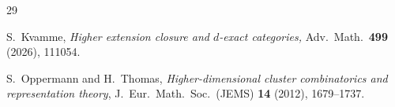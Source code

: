 \documentclass[12pt,reqno]{amsart}
\numberwithin{equation}{section}
\theoremstyle{definition}
\theoremstyle{theorem}
\theoremstyle{definition}
\begin{document}
\begin{thebibliography}{29}
%
%


  S.\ Kvamme, {\it Higher extension closure and $d$-exact categories,} Adv.\ Math.\ {\bf 499} (2026), 111054.


%




%

  S.\ Oppermann and H.\ Thomas, {\it Higher-dimensional cluster combinatorics and representation theory}, J.\ Eur.\ Math.\ Soc.\ (JEMS) {\bf 14} (2012), 1679--1737.



\end{thebibliography}
\end{document}
